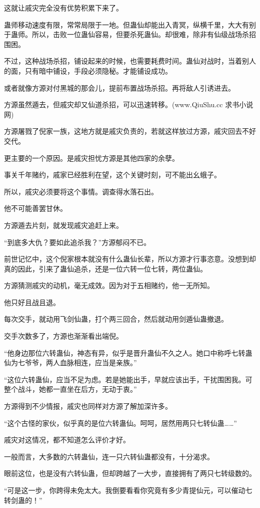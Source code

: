 \begin{this_body}
这就让戚灾完全没有优势积累下来了。

蛊师移动速度有限，常常局限于一地。但蛊仙却能出入青冥，纵横千里，大大有别于蛊师。所以，击败一位蛊仙容易，但要杀死蛊仙。却很难，除非有仙级战场杀招围困。

不过，这种战场杀招，铺设起来的时候，也需要耗费时间。蛊仙对战时，当着别人的面，只有暗中铺设，手段必须隐秘。才能铺设成功。

或者就像方源对付黑城的那会儿，提前布置战场杀招。再将敌人引诱进去。

方源虽然遁去，但戚灾却又仙道杀招，可以迅速转移。(www.QiuShu.cc 求书小说网)

方源屠戮了倪家一族，这地方就是戚灾负责的，若就这样放过方源，戚灾回去不好交代。

更主要的一个原因。是戚灾担忧方源是其他四家的余孽。

事关千年赌约，戚家已经胜利在望，这个关键时刻，可不能出幺蛾子。

所以，戚灾必须要将这个事情。调查得水落石出。

他不可能善罢甘休。

方源遁去片刻，就发现戚灾追赶上来。

“到底多大仇？要如此追杀我？”方源郁闷不已。

前世记忆中，这个倪家根本就没有什么蛊仙长辈，所以方源才行事恣意。没想到却真的因此，引来了蛊仙追杀，还是一位六转一位七转，两位蛊仙。

方源猜测戚灾的动机，毫无成效。因为对于五相赌约，他一无所知。

他只好且战且退。

每次交手，就动用飞剑仙蛊，打个两三回合，然后就动用剑遁仙蛊撤退。

交手次数多了，方源也渐渐看出端倪。

“他身边那位六转蛊仙，神态有异，似乎是晋升蛊仙不久之人。她口中称呼七转蛊仙为七爷爷，两人血脉相连，应当是亲族。”

“这位六转蛊仙，应当不足为虑。若是她能出手，早就应该出手，干扰围困我。可整个战斗，她都一直坐在后方，无动于衷。”

方源得到不少情报，戚灾也同样对方源了解加深许多。

“这个古怪的家伙，似乎真的是位六转蛊仙。呵呵，居然用两只七转仙蛊……”

戚灾对这情况，都不知道怎么评价才好。

一般而言，大多数的六转蛊仙，连一只六转仙蛊都没有，十分渴求。

眼前这位，也是没有六转仙蛊，但却跨越了一大步，直接拥有了两只七转级数的。

“可是这一步，你跨得未免太大。我倒要看看你究竟有多少青提仙元，可以催动七转剑蛊的！”


\end{this_body}
